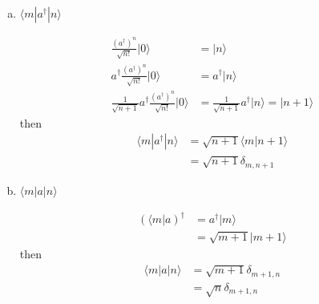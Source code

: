 \documentclass[../main.tex]{subfiles}
\begin{document}
\begin{enumerate}[(a)]
\item $\langle m|a^\dagger|n\rangle$

\begin{align}
\frac{(a^\dagger)^n}{\sqrt{n!}}|0\rangle&=|n\rangle\\
a^\dagger\frac{(a^\dagger)^n}{\sqrt{n!}}|0\rangle&=a^\dagger|n\rangle\\
\frac{1}{\sqrt{n+1}}a^\dagger\frac{(a^\dagger)^n}{\sqrt{n!}}|0\rangle&=\frac{1}{\sqrt{n+1}}a^\dagger|n\rangle=|n+1\rangle
\end{align}
then
\begin{align}
\langle m|a^\dagger|n\rangle
&=\sqrt{n+1}\langle m|n+1\rangle\\
&=\sqrt{n+1}\delta_{m,n+1}
\end{align}

\item $\langle m|a|n\rangle$

\begin{align}
(\langle m|a)^\dagger
&=a^\dagger|m\rangle\\
&=\sqrt{m+1}|m+1\rangle
\end{align}
then
\begin{align}
\langle m|a|n\rangle
&=\sqrt{m+1}\delta_{m+1,n}\\
&=\sqrt{n}\delta_{m+1,n}
\end{align}
\end{enumerate}
\end{document}
